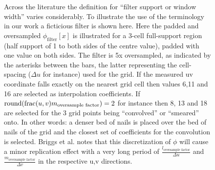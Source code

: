  \begin{figure}[h]
  \begin{mdframed}
   \centering
   \caption[Oversampled filter illustration]{Across the literature the definition for ``filter support or window width'' varies considerably. To illustrate the use of the
   terminology in our work a ficticious filter is shown here. Here the padded and oversampled $\phi_{\text{filter}}[x]$ is illustrated for a 3-cell full-support 
   region (half support of 1 to both sides of the centre value), padded with one value on both sides. The filter is 5x oversampled, as indicated by the asterisks
   between the bars, the latter representing the cell-spacing ($\Delta{u}$ for instance) used for the grid. If the measured uv coordinate falls exactly on the nearest grid 
   cell then values 6,11 and 16 are selected as interpolation coefficients. If $\textrm{round}{(\textrm{frac}{(u,v)}m_{\text{oversample factor}})} = 2$ for instance 
   then 8, 13 and 18 are selected for the 3 grid points being ``convolved'' or ``smeared'' onto. In other words: a denser bed of nails is placed over the bed of 
   nails of the grid and the closest set of coefficients for the convolution is selected. Briggs et al. \cite[Lecture 7]{taylor1999synthesis} notes that this discretization
   of $\phi$ will cause a minor replication effect with a very long period of $\frac{l_{\text{oversample factor}}}{\Delta{u}}$ and 
   $\frac{m_{\text{oversample factor}}}{\Delta{v}}$ in the respective u,v directions.}
   \label{fig_filter}
  \end{mdframed}
 \end{figure}
